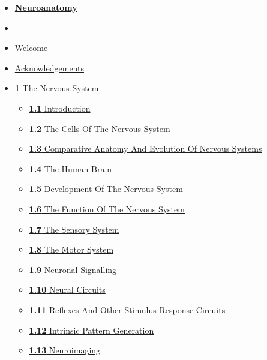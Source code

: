 \begin{itemize}
\tightlist
\item
  \textbf{\href{./}{Neuroanatomy}}
\item
\item
  \href{index.html}{\emph{}Welcome}
\item
  \href{acknowledgements.html}{\emph{}Acknowledgements}
\item
  \href{the-nervous-system.html}{\emph{}\textbf{1} The Nervous System}

  \begin{itemize}
  \tightlist
  \item
    \href{the-nervous-system.html\#introduction}{\emph{}\textbf{1.1}
    Introduction}
  \item
    \href{the-nervous-system.html\#the-cells-of-the-nervous-system}{\emph{}\textbf{1.2}
    The Cells Of The Nervous System}
  \item
    \href{the-nervous-system.html\#comparative-anatomy-and-evolution-of-nervous-systems}{\emph{}\textbf{1.3}
    Comparative Anatomy And Evolution Of Nervous Systems}
  \item
    \href{the-nervous-system.html\#the-human-brain}{\emph{}\textbf{1.4}
    The Human Brain}
  \item
    \href{the-nervous-system.html\#development-of-the-nervous-system}{\emph{}\textbf{1.5}
    Development Of The Nervous System}
  \item
    \href{the-nervous-system.html\#the-function-of-the-nervous-system}{\emph{}\textbf{1.6}
    The Function Of The Nervous System}
  \item
    \href{the-nervous-system.html\#the-sensory-system}{\emph{}\textbf{1.7}
    The Sensory System}
  \item
    \href{the-nervous-system.html\#the-motor-system}{\emph{}\textbf{1.8}
    The Motor System}
  \item
    \href{the-nervous-system.html\#neuronal-signalling}{\emph{}\textbf{1.9}
    Neuronal Signalling}
  \item
    \href{the-nervous-system.html\#neural-circuits}{\emph{}\textbf{1.10}
    Neural Circuits}
  \item
    \href{the-nervous-system.html\#reflexes-and-other-stimulus-response-circuits}{\emph{}\textbf{1.11}
    Reflexes And Other Stimulus-Response Circuits}
  \item
    \href{the-nervous-system.html\#intrinsic-pattern-generation}{\emph{}\textbf{1.12}
    Intrinsic Pattern Generation}
  \item
    \href{the-nervous-system.html\#neuroimaging}{\emph{}\textbf{1.13}
    Neuroimaging}


\end{itemize}
\end{itemize}
